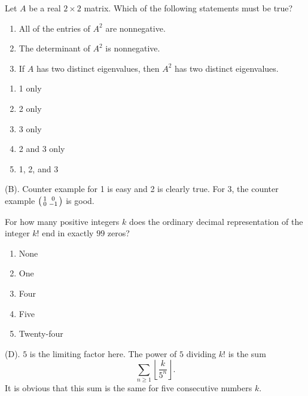 \begin{exercise}
Let $A$ be a real $2\times2$ matrix. Which of the following statements
must be true?
\begin{enumerate}
    \item All of the entries of $A^2$ are nonnegative.
    \item The determinant of $A^2$ is nonnegative.
    \item If $A$ has two distinct eigenvalues, then $A^2$ has two distinct eigenvalues.
\end{enumerate}
\begin{enumerate}[label=(\Alph*)]
    \item 1 only
    \item 2 only
    \item 3 only
    \item 2 and 3 only
    \item 1, 2, and 3
\end{enumerate}
\end{exercise}
\begin{solution}
(B). Counter example for 1 is easy and 2 is clearly true. For 3, 
the counter example $\begin{psmallmatrix}
1 & 0 \\ 0 & -1
\end{psmallmatrix}$ is good.
\end{solution}


\begin{exercise}
For how many positive integers $k$ does the ordinary decimal representation of
the integer $k!$ end in exactly $99$ zeros?
\begin{enumerate}[label=(\Alph*)]
    \item None
    \item One
    \item Four
    \item Five
    \item Twenty-four
\end{enumerate}
\end{exercise}
\begin{solution}
(D). $5$ is the limiting factor here.
The power of $5$ dividing $k!$ is the sum 
\[
\sum_{n \geq 1} \left \lfloor \frac{k}{5^n} \right\rfloor.
\]
It is obvious that this sum is the same for five consecutive numbers $k$.
\end{solution}

